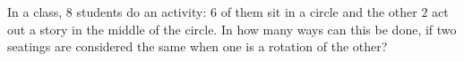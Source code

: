 In a class, $8$ students do an activity: $6$ of them sit in a circle and the other $2$ act out a story in the middle of the circle. In how many ways can this be done, if two seatings are considered the same when one is a rotation of the other?
